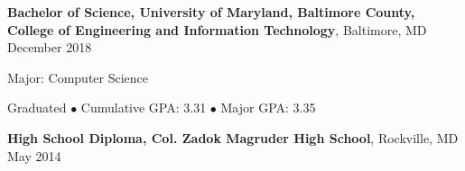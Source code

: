 \textbf{Bachelor of Science, University of Maryland, Baltimore County, College of Engineering and Information Technology}, Baltimore, MD \hfill December 2018

Major: Computer Science

Graduated $\bullet$ Cumulative GPA: 3.31 $\bullet$ Major GPA: 3.35

\textbf{High School Diploma, Col. Zadok Magruder High School}, Rockville, MD \hfill May 2014
